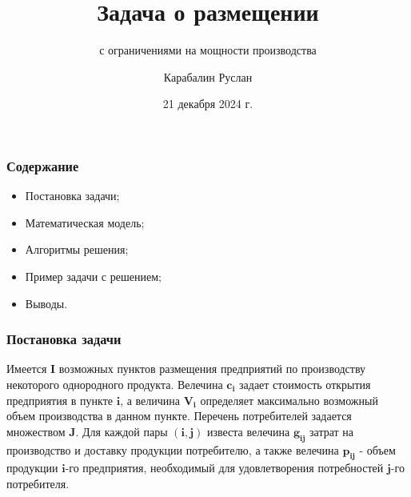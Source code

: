 \documentclass[12pt]{beamer}
\title{Задача о размещении}
\subtitle{с ограничениями на мощности производства}
\author{Карабалин Руслан}
\date{21 декабря 2024 г.}
\begin{document}
	
	\begin{frame}
		\titlepage
	\end{frame}

    \begin{frame}
        \frametitle{Содержание}

        \begin{itemize}
            \item Постановка задачи;
            \item Математическая модель;
            \item Алгоритмы решения;
            \item Пример задачи с решением;
            \item Выводы.
        \end{itemize}

    \end{frame}

    \begin{frame}
        \frametitle{Постановка задачи}

        Имеется $\boldsymbol{I}$ возможных пунктов размещения предприятий
        по производству некоторого однородного продукта.
        Велечина $\boldsymbol{c_{i}}$ задает стоимость открытия предприятия
        в пункте $\boldsymbol{i}$, а величина $\boldsymbol{V_{i}}$ определяет максимально
        возможный объем производства в данном пункте.
        Перечень потребителей задается множеством $\boldsymbol{J}$.
        Для каждой пары $\boldsymbol{(i, j)}$ известа велечина $\boldsymbol{g_{ij}}$
        затрат на производство и доставку продукции потребителю,
        а также велечина $\boldsymbol{p_{ij}}$ - объем продукции $\boldsymbol{i}$-го предприятия,
        необходимый для удовлетворения потребностей
        $\boldsymbol{j}$-го потребителя.
        
    \end{frame}
\end{document}

